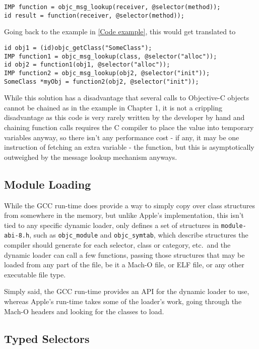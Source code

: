 \begin{verbatim}
IMP function = objc_msg_lookup(receiver, @selector(method));
id result = function(receiver, @selector(method));
\end{verbatim}

Going back to the example in \ref{Code example}, this would get translated to

\begin{verbatim}
id obj1 = (id)objc_getClass("SomeClass");
IMP function1 = objc_msg_lookup(class, @selector("alloc"));
id obj2 = function1(obj1, @selector("alloc"));
IMP function2 = objc_msg_lookup(obj2, @selector("init"));
SomeClass *myObj = function2(obj2, @selector("init"));
\end{verbatim}

While this solution has a disadvantage that several calls to Objective-C objects cannot be chained as in the example in Chapter 1, it is not a crippling disadvantage as this code is very rarely written by the developer by hand and chaining function calls requires the C compiler to place the value into temporary variables anyway, so there isn't any performance cost - if any, it may be one instruction of fetching an extra variable - the function, but this is asymptotically outweighed by the message lookup mechanism anyways.

\subsection{Module Loading}

While the GCC run-time does provide a way to simply copy over class structures from somewhere in the memory, but unlike Apple's implementation, this isn't tied to any specific dynamic loader, only defines a set of structures in \verb=module-abi-8.h=, such as \verb=objc_module= and \verb=objc_symtab=, which describe structures the compiler should generate for each selector, class or category, etc.\ and the dynamic loader can call a few functions, passing those structures that may be loaded from any part of the file, be it a Mach-O file, or ELF file, or any other executable file type.

Simply said, the GCC run-time provides an API for the dynamic loader to use, whereas Apple's run-time takes some of the loader's work, going through the Mach-O headers and looking for the classes to load.

\subsection{Typed Selectors}

